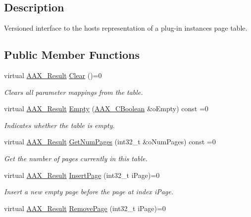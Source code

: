 \subsection{Description}
Versioned interface to the host\textquotesingle{}s representation of a plug-\/in instance\textquotesingle{}s page table. \subsection*{Public Member Functions}
\begin{DoxyCompactItemize}
\item 
virtual \hyperlink{a00149_a4d8f69a697df7f70c3a8e9b8ee130d2f}{A\+A\+X\+\_\+\+Result} \hyperlink{a00074_a664fd7f2edd4f258f258541c85cf3a30}{Clear} ()=0
\begin{DoxyCompactList}\small\item\em Clears all parameter mappings from the table. \end{DoxyCompactList}\item 
virtual \hyperlink{a00149_a4d8f69a697df7f70c3a8e9b8ee130d2f}{A\+A\+X\+\_\+\+Result} \hyperlink{a00074_ac76672810be58fb013c193ba50170f53}{Empty} (\hyperlink{a00149_aa216506530f1d19a2965931ced2b274b}{A\+A\+X\+\_\+\+C\+Boolean} \&o\+Empty) const =0
\begin{DoxyCompactList}\small\item\em Indicates whether the table is empty. \end{DoxyCompactList}\item 
virtual \hyperlink{a00149_a4d8f69a697df7f70c3a8e9b8ee130d2f}{A\+A\+X\+\_\+\+Result} \hyperlink{a00074_a8c86b0cfe2d9cfe8b745c09ccf2d8619}{Get\+Num\+Pages} (int32\+\_\+t \&o\+Num\+Pages) const =0
\begin{DoxyCompactList}\small\item\em Get the number of pages currently in this table. \end{DoxyCompactList}\item 
virtual \hyperlink{a00149_a4d8f69a697df7f70c3a8e9b8ee130d2f}{A\+A\+X\+\_\+\+Result} \hyperlink{a00074_aed3706e4e59c9cf58603db7d06888c81}{Insert\+Page} (int32\+\_\+t i\+Page)=0
\begin{DoxyCompactList}\small\item\em Insert a new empty page before the page at index {\ttfamily i\+Page}. \end{DoxyCompactList}\item 
virtual \hyperlink{a00149_a4d8f69a697df7f70c3a8e9b8ee130d2f}{A\+A\+X\+\_\+\+Result} \hyperlink{a00074_a111b8371211623bf0c73e6fe8e77c82c}{Remove\+Page} (int32\+\_\+t i\+Page)=0

\end{DoxyCompactItemize}
